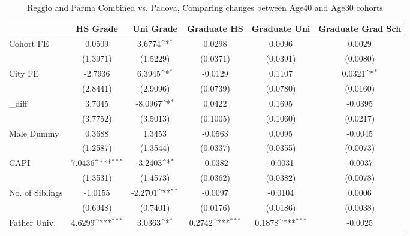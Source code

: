 \begin{table}[htbp]\centering
\def\sym#1{\ifmmode^{#1}\else\(^{#1}\)\fi}
\caption{Reggio and Parma Combined vs. Padova, Comparing changes between Age40 and Age30 cohorts}
\begin{tabular}{l*{5}{c}}
\toprule
            &\multicolumn{1}{c}{HS Grade}&\multicolumn{1}{c}{Uni Grade}&\multicolumn{1}{c}{Graduate HS}&\multicolumn{1}{c}{Graduate Uni}&\multicolumn{1}{c}{Graduate Grad Sch}\\
\midrule
Cohort FE   &      0.0509         &      3.6774\sym{*}  &      0.0298         &      0.0096         &      0.0029         \\
            &    (1.3971)         &    (1.5229)         &    (0.0371)         &    (0.0391)         &    (0.0080)         \\
\addlinespace
City FE     &     -2.7936         &      6.3945\sym{*}  &     -0.0129         &      0.1107         &      0.0321\sym{*}  \\
            &    (2.8441)         &    (2.9096)         &    (0.0739)         &    (0.0780)         &    (0.0160)         \\
\addlinespace
\_diff       &      3.7045         &     -8.0967\sym{*}  &      0.0422         &      0.1695         &     -0.0395         \\
            &    (3.7752)         &    (3.5013)         &    (0.1005)         &    (0.1060)         &    (0.0217)         \\
\addlinespace
Male Dummy  &      0.3688         &      1.3453         &     -0.0563         &      0.0095         &     -0.0045         \\
            &    (1.2587)         &    (1.3544)         &    (0.0337)         &    (0.0355)         &    (0.0073)         \\
\addlinespace
CAPI        &      7.0436\sym{***}&     -3.2403\sym{*}  &     -0.0382         &     -0.0031         &     -0.0037         \\
            &    (1.3531)         &    (1.4573)         &    (0.0362)         &    (0.0382)         &    (0.0078)         \\
\addlinespace
No. of Siblings&     -1.0155         &     -2.2701\sym{**} &     -0.0097         &     -0.0104         &      0.0006         \\
            &    (0.6948)         &    (0.7401)         &    (0.0176)         &    (0.0186)         &    (0.0038)         \\
\addlinespace
Father Univ.&      4.6299\sym{***}&      3.0363\sym{*}  &      0.2742\sym{***}&      0.1878\sym{***}&     -0.0025         \\

\end{tabular}
\end{table}
